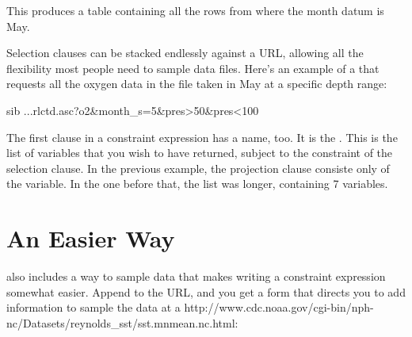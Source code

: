 \documentclass{dods-book}
\begin{document}
This produces a table containing all the rows from
 where the
month datum is May.  

Selection clauses can be stacked endlessly against a URL, allowing all
the flexibility most people need to sample data files.  Here's an
example of a
that requests all the oxygen data in the file taken in May at a
specific depth range:

\begin{vcode}[http://dods.gso.uri.edu/cgi-bin/nph-jg/rlctd.asc?o2&month_s=5&pres>50&pres<100]{sib}
...rlctd.asc?o2&month_s=5&pres>50&pres<100
\end{vcode}

The first clause in a constraint expression has a name, too.  It is
the .  This is the list of variables that you
wish to have returned, subject to the constraint of the selection
clause.  In the previous example, the projection clause consiste only
of the  variable.  In the one before that, the list was
longer, containing 7 variables. 






\section{An Easier Way}

\opendap also includes a way to sample data that makes writing a
constraint expression somewhat easier.  Append  to the URL,
and you get a form that directs you to add information to sample the
data at a 
{http://www.cdc.noaa.gov/cgi-bin/nph-nc/Datasets/reynolds_sst/sst.mnmean.nc.html}:
\end{document}

